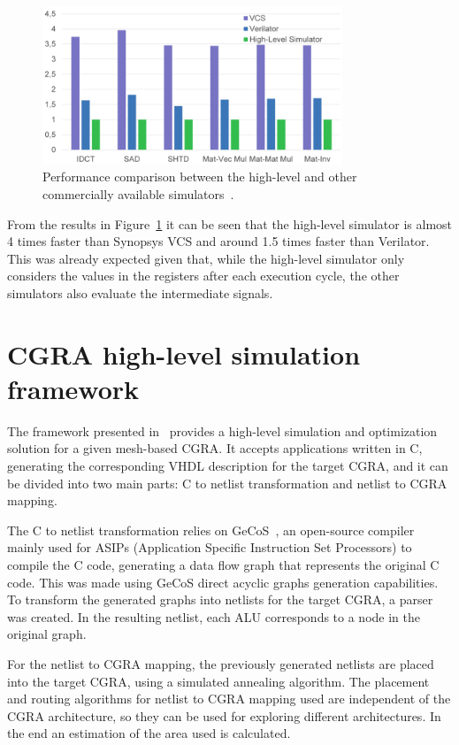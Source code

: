 \begin{figure}[!htb]
	\centering
	\includegraphics[width=0.8\textwidth]{Figures/hlperformance.png}
	\caption{Performance comparison between the high-level and other commercially available simulators~\cite{chen:CGRA}.}
	\label{fig:hlperformance}
\end{figure}

From the results in Figure~\ref{fig:hlperformance} it can be seen that the
high-level simulator is almost 4 times faster than Synopsys VCS and around 1.5
times faster than Verilator. This was already expected given that, while the
high-level simulator only considers the values in the registers after each
execution cycle, the other simulators also evaluate the intermediate signals.

\section{CGRA high-level simulation framework}
\label{section:framework}

The framework presented in~\cite{pasha:CGRA} provides a high-level simulation
and optimization solution for a given mesh-based CGRA. It accepts applications
written in C, generating the corresponding VHDL description for the target CGRA,
and it can be divided into two main parts: C to netlist transformation and
netlist to CGRA mapping.

The C to netlist transformation relies on GeCoS~\cite{l'hours:FPGA}, an
open-source compiler mainly used for ASIPs (Application Specific Instruction Set
Processors) to compile the C code, generating a data flow graph that represents
the original C code. This was made using GeCoS direct acyclic graphs generation
capabilities. To transform the generated graphs into netlists for the target
CGRA, a parser was created. In the resulting netlist, each ALU corresponds to a
node in the original graph.

For the netlist to CGRA mapping, the previously generated netlists are placed
into the target CGRA, using a simulated annealing algorithm. The placement and
routing algorithms for netlist to CGRA mapping used are independent of the CGRA
architecture, so they can be used for exploring different architectures. In the
end an estimation of the area used is calculated.

